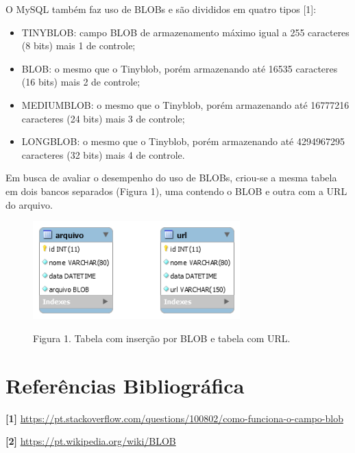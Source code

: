 \documentclass[12pt,a4paper]{article}
\begin{document}
O MySQL também faz uso de BLOBs e são divididos em quatro tipos [1]:
\begin{itemize}
	\item TINYBLOB: campo BLOB de armazenamento máximo igual a 255 caracteres (8 bits) mais 1 de controle;
	\item BLOB: o mesmo que o Tinyblob, porém armazenando até 16535 caracteres (16 bits) mais 2 de controle;
	\item MEDIUMBLOB: o mesmo que o Tinyblob, porém armazenando até 16777216 caracteres (24 bits) mais 3 de controle;
	\item LONGBLOB: o mesmo que o Tinyblob, porém armazenando até 4294967295 caracteres (32 bits) mais 4 de controle.
\end{itemize}

Em busca de avaliar o desempenho do uso de BLOBs, criou-se a mesma tabela em dois bancos separados (Figura 1), uma contendo o BLOB e outra com a URL do arquivo.

\begin{figure}[htb]
	\label{figura:tabelas}
	\centering
	\includegraphics[width=8cm]{recursos/imagens/tabelas.png} 
	
	Figura 1. Tabela com inserção por BLOB e tabela com URL.
\end{figure}


%



%

%


\section{Referências Bibliográfica}
\noindent \textbf{[1]} \url {https://pt.stackoverflow.com/questions/100802/como-funciona-o-campo-blob}\\\vspace{0.2cm}

\noindent \textbf{[2] }\url{https://pt.wikipedia.org/wiki/BLOB}\\\vspace{0.2cm}
\end{document}

